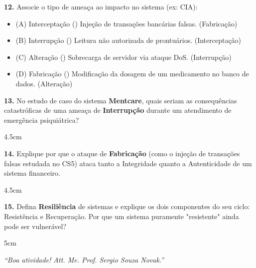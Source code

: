 \documentclass[12pt]{article}
\begin{document}
\vspace{0.5cm}

\noindent \textbf{12.} Associe o tipo de ameaça ao impacto no sistema (ex: CIA):
\begin{itemize}
    \item (A) Interceptação \quad (\quad) Injeção de transações bancárias falsas. (Fabricação)
    \item (B) Interrupção \quad (\quad) Leitura não autorizada de prontuários. (Interceptação)
    \item (C) Alteração \quad (\quad) Sobrecarga de servidor via ataque DoS. (Interrupção)
    \item (D) Fabricação \quad (\quad) Modificação da dosagem de um medicamento no banco de dados. (Alteração)
\end{itemize}

\vspace{0.5cm}

\noindent \textbf{13.} No estudo de caso do sistema \textbf{Mentcare}, quais seriam as consequências catastróficas de uma ameaça de \textbf{Interrupção} durante um atendimento de emergência psiquiátrica?
\begin{resposta}{4.5cm}
\end{resposta}

\vspace{0.5cm}

\noindent \textbf{14.} Explique por que o ataque de \textbf{Fabricação} (como o injeção de transações falsas estudada no CS5) ataca tanto a Integridade quanto a Autenticidade de um sistema financeiro.
\begin{resposta}{4.5cm}
\end{resposta}

\vspace{0.5cm}

\noindent \textbf{15.} Defina \textbf{Resiliência} de sistemas e explique os dois componentes do seu ciclo: Resistência e Recuperação. Por que um sistema puramente "resistente" ainda pode ser vulnerável?
\begin{resposta}{5cm}
\end{resposta}

\vspace{0.8cm}

\begin{center}
  \textit{``Boa atividade! Att. Me. Prof. Sergio Souza Novak.''}
\end{center}
\end{document}
